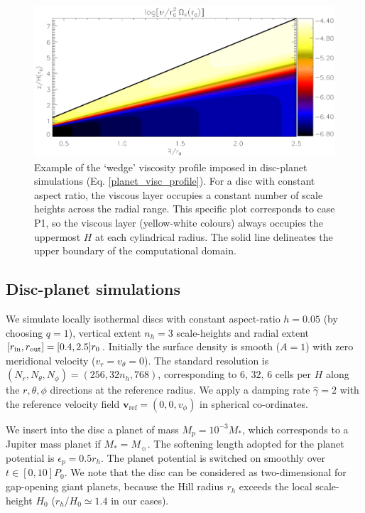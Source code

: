 \begin{figure}
  \centering
  \includegraphics[width=\linewidth]{figures/pdisk_visc2d_planet}
  \caption{Example of the `wedge' viscosity profile
    imposed in disc-planet simulations
    (Eq. \ref{planet_visc_profile}).  
    For a disc with constant aspect ratio, the viscous
    layer occupies a constant number of scale heights across the
    radial range. This specific plot corresponds to case P1, so the
    viscous layer (yellow-white colours) always occupies the uppermost
    $H$ at each cylindrical radius. 
    The solid line delineates the upper boundary of the computational
    domain. 
    \label{planet_visc2d}}
\end{figure}

\subsection{Disc-planet simulations} 
We simulate locally isothermal discs with constant aspect-ratio
$h=0.05$ (by choosing $q=1$), vertical extent $n_h=3$ scale-heights 
and radial extent $[r_\mathrm{in},r_\mathrm{out}]=[0.4,2.5]r_0$. Initially the surface density is smooth
($A=1$) with zero meridional velocity ($v_r=v_\theta=0$). 
The standard resolution is $(N_r, N_\theta,
N_\phi)=(256, 32n_h, 768)$, corresponding to $6,\,32,\,6$ 
cells per $H$ along the $r,\theta,\phi$ directions at the reference
radius. We apply a damping rate $\hat{\gamma}=2$ with the reference
velocity field $\bm{v}_\mathrm{ref}=(0,0,v_\phi)$ in spherical
co-ordinates.   

We insert into the disc a planet of mass  
$M_p=10^{-3}M_*$, which corresponds to a Jupiter mass planet if
$M_*=M_{\sun}$. The softening length adopted for the planet potential is
$\epsilon_p=0.5r_h$. The planet potential is switched on 
smoothly over $t\in[0,10]P_0$. We note that the disc can be considered
as two-dimensional for gap-opening giant planets, because the Hill
radius $r_h$ exceeds the local scale-height $H_0$ ($r_h/H_0\simeq1.4$
in our cases).   

